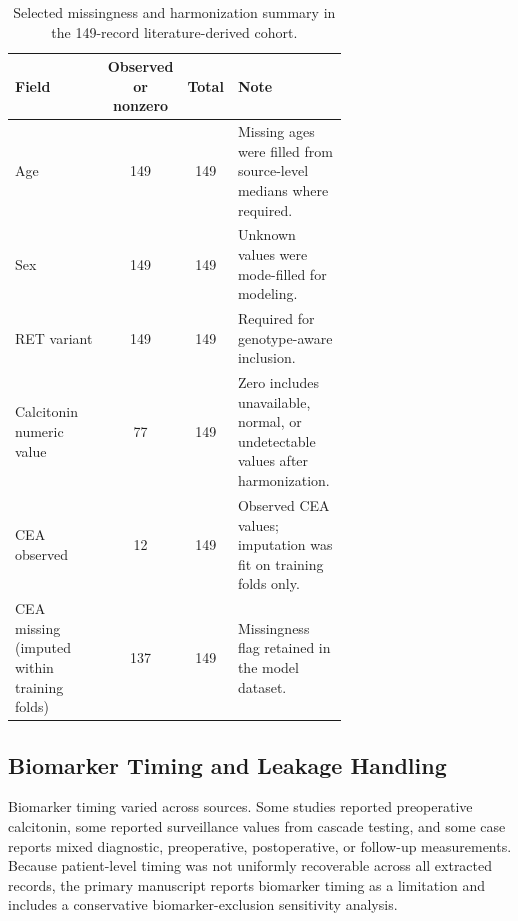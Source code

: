 \documentclass[12pt]{article}
\begin{document}
\begin{table}[ht]
\centering
\caption{Selected missingness and harmonization summary in the 149-record literature-derived cohort.}
\begin{tabular}{@{}p{0.32\linewidth}ccp{0.34\linewidth}@{}}
\toprule
Field & Observed or nonzero & Total & Note \\
\midrule
Age & 149 & 149 & Missing ages were filled from source-level medians where required. \\
Sex & 149 & 149 & Unknown values were mode-filled for modeling. \\
RET variant & 149 & 149 & Required for genotype-aware inclusion. \\
Calcitonin numeric value & 77 & 149 & Zero includes unavailable, normal, or undetectable values after harmonization. \\
CEA observed & 12 & 149 & Observed CEA values; imputation was fit on training folds only. \\
CEA missing (imputed within training folds) & 137 & 149 & Missingness flag retained in the model dataset. \\
\bottomrule
\end{tabular}
\end{table}

\subsection{Biomarker Timing and Leakage Handling}
Biomarker timing varied across sources. Some studies reported preoperative calcitonin, some reported surveillance values from cascade testing, and some case reports mixed diagnostic, preoperative, postoperative, or follow-up measurements. Because patient-level timing was not uniformly recoverable across all extracted records, the primary manuscript reports biomarker timing as a limitation and includes a conservative biomarker-exclusion sensitivity analysis.
\end{document}
